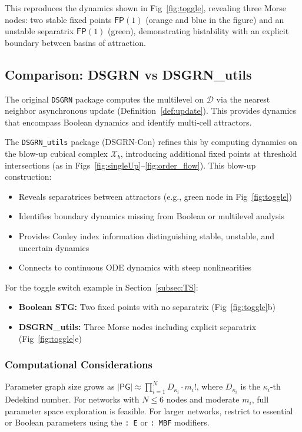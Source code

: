\documentclass[12pt, notitlepage]{amsart}
\newcommand{\cD}{\mathcal{D}}
\newcommand{\cX}{{\mathcal X}}
\theoremstyle{definition}
\newcommand{\PG}{\mathsf{PG}}
\newcommand{\STG}{\mathsf{STG}}
\newcommand{\FP}{\mathsf{FP}}
\begin{document}
    This reproduces the dynamics shown in Fig~\ref{fig:toggle}, revealing three Morse nodes: two stable fixed points $\FP(1)$ (orange and blue in the figure) and an unstable separatrix $\FP(1)$ (green), demonstrating bistability with an explicit boundary between basins of attraction.


    \subsection{Comparison: DSGRN vs DSGRN\_utils}

    The original \texttt{DSGRN} package computes the multilevel \STG{} on $\cD$ via the nearest neighbor asynchronous update (Definition~\ref{def:update}). This provides dynamics that encompass Boolean dynamics and identify multi-cell attractors.

    The \texttt{DSGRN\_utils} package (DSGRN-Con) refines this by computing dynamics on the blow-up cubical complex $\cX_b$, introducing additional fixed points at threshold intersections (as in Figs~\ref{fig:singleUp}--\ref{fig:order_flow}). This blow-up construction:
    \begin{itemize}
    \item Reveals separatrices between attractors (e.g., green node in Fig~\ref{fig:toggle})
    \item Identifies boundary dynamics missing from Boolean or multilevel analysis
    \item Provides Conley index information distinguishing stable, unstable, and uncertain dynamics
    \item Connects to continuous ODE dynamics with steep nonlinearities~\cite{rook_field:24}
    \end{itemize}

    For the toggle switch example in Section~\ref{subsec:TS}:
    \begin{itemize}
    \item \textbf{Boolean STG:} Two fixed points with no separatrix (Fig~\ref{fig:toggle}b)
    \item \textbf{DSGRN\_utils:} Three Morse nodes including explicit separatrix (Fig~\ref{fig:toggle}e)
    \end{itemize}

    \subsubsection{Computational Considerations}

    Parameter graph size grows as $|\PG| \approx \prod_{i=1}^{N} D_{\kappa_i} \cdot m_i!$, where $D_{\kappa_i}$ is the $\kappa_i$-th Dedekind number. For networks with $N \leq 6$ nodes and moderate $m_i$, full parameter space exploration is feasible. For larger networks, restrict to essential or Boolean parameters using the \texttt{: E} or \texttt{: MBF} modifiers.


    
    

    
\end{document}
